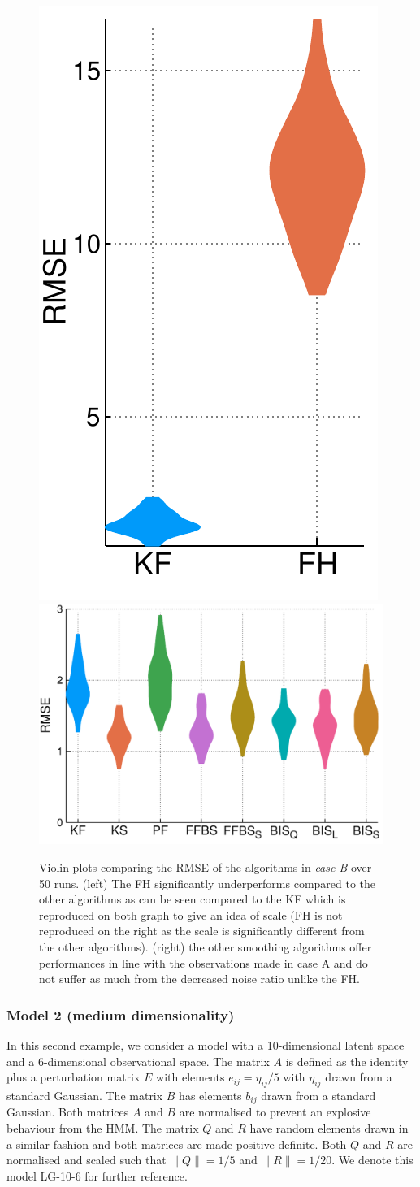\begin{figure}[!h]
\center
\includegraphics[width=.24\textwidth]{figures/tfs/comparison_caseB_fh+kf}
\includegraphics[width=.61\textwidth]{figures/tfs/comparison_caseB}
\caption{\label{comp-smoothing-B}Violin plots comparing the RMSE of the algorithms in \emph{case B} over 50 runs. (left) The FH significantly underperforms  compared to the other algorithms as can be seen compared to the KF which is reproduced on both graph to give an idea of scale (FH is not reproduced on the right as the scale is significantly different from the other algorithms). (right) the other smoothing algorithms offer performances in line with the observations made in case A and do not suffer as much from the decreased noise ratio unlike the FH.}
\end{figure}


\subsubsection{Model 2 (medium dimensionality)}
In this second example, we consider a model with a 10-dimensional latent space and a 6-dimensional observational space. The matrix $A$ is defined as the identity plus a perturbation matrix $E$ with elements $e_{ij}=\eta_{ij}/5$ with $\eta_{ij}$ drawn from a standard Gaussian. The matrix $B$ has elements $b_{ij}$ drawn from a standard Gaussian. Both matrices $A$ and $B$ are normalised to prevent an explosive behaviour from the HMM. The matrix $Q$ and $R$ have random elements drawn in a similar fashion and both matrices are made positive definite. Both $Q$ and $R$ are normalised and scaled such that $\| Q\| = 1/5$ and $\| R\| = 1/20$. We denote this model LG-10-6 for further reference.

